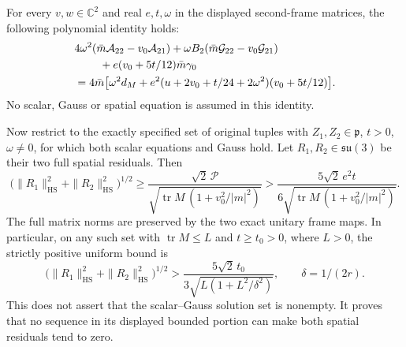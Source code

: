 \begin{proposition}
\label{q444:twocross:quantitative}
For every $v,w\in\mathbb C^2$ and real $e,t,\omega$ in the displayed
second-frame matrices, the following polynomial identity holds:
\begin{align}
 &4\omega^2(\bar m\mathcal A_{22}-v_0\mathcal A_{21})
   +\omega B_2(\bar m\mathcal G_{22}-v_0\mathcal G_{21})\notag\\
 &\hspace{8mm}+e(v_0+5t/12)\bar m\gamma_0\notag\\
 &=4\bar m\bigl[\omega^2d_M+
      e^2(u+2v_0+t/24+2\omega^2)(v_0+5t/12)\bigr].
 \label{q444:twocross:polynomial-certificate}
\end{align}
No scalar, Gauss or spatial equation is assumed in this identity.

Now restrict to the exactly specified set of original tuples with
$Z_1,Z_2\in\mathfrak p$, $t>0$, $\omega\ne0$, for which both
scalar equations and Gauss hold. Let $R_1,R_2\in\mathfrak{su}(3)$
be their two full spatial residuals. Then
\begin{equation}
 \bigl(\|R_1\|_{\mathrm{HS}}^2+
             \|R_2\|_{\mathrm{HS}}^2\bigr)^{1/2}
 \geq
 \frac{\sqrt2\,\mathcal P}
 {\sqrt{\operatorname{tr}M\,(1+v_0^2/|m|^2)}}
 >\frac{5\sqrt2\,e^2t}
 {6\sqrt{\operatorname{tr}M\,(1+v_0^2/|m|^2)}}.
 \label{q444:twocross:residual-lower-bound}
\end{equation}
The full matrix norms are preserved by the two exact unitary frame maps.
In particular, on any such set with $\operatorname{tr}M\leq L$ and
$t\geq t_0>0$, where $L>0$, the strictly positive uniform bound is
\begin{equation}
 \bigl(\|R_1\|_{\mathrm{HS}}^2+
             \|R_2\|_{\mathrm{HS}}^2\bigr)^{1/2}
 >\frac{5\sqrt2\,t_0}
 {3\sqrt{L(1+L^2/\delta^2)}},\qquad \delta=1/(2r).
 \label{q444:twocross:uniform-bound}
\end{equation}
This does not assert that the scalar--Gauss solution set is nonempty.
It proves that no sequence in its displayed bounded portion can make
both spatial residuals tend to zero.
\end{proposition}

